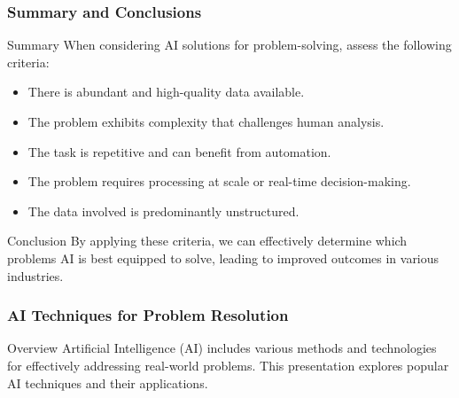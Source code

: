 \documentclass{beamer}
\begin{document}
\begin{frame}[fragile]
    \frametitle{Summary and Conclusions}
    \begin{block}{Summary}
        When considering AI solutions for problem-solving, assess the following criteria:
        \begin{itemize}
            \item There is abundant and high-quality data available.
            \item The problem exhibits complexity that challenges human analysis.
            \item The task is repetitive and can benefit from automation.
            \item The problem requires processing at scale or real-time decision-making.
            \item The data involved is predominantly unstructured.
        \end{itemize}
    \end{block}
    \begin{block}{Conclusion}
        By applying these criteria, we can effectively determine which problems AI is best equipped to solve, leading to improved outcomes in various industries.
    \end{block}
\end{frame}

\begin{frame}
    \frametitle{AI Techniques for Problem Resolution}
    \begin{block}{Overview}
        Artificial Intelligence (AI) includes various methods and technologies for effectively addressing real-world problems. This presentation explores popular AI techniques and their applications.
    \end{block}
\end{frame}
\end{document}

